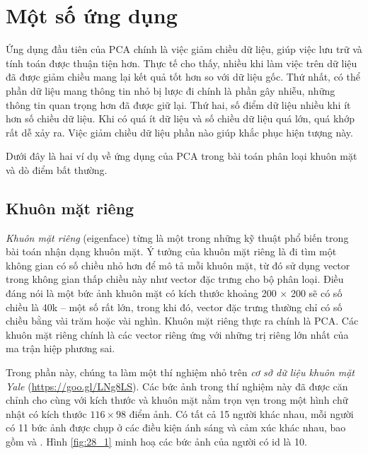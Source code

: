  
 
\section{Một số ứng dụng}
 Ứng dụng đầu tiên của PCA chính là việc giảm chiều dữ liệu, giúp
 việc lưu trữ và tính toán được thuận tiện hơn. Thực tế cho thấy, nhiều khi làm
 việc trên dữ liệu đã được giảm chiều mang lại kết quả tốt hơn so với dữ liệu
 gốc. Thứ nhất, có thể phần dữ liệu mang thông tin nhỏ bị lược đi chính là phần
 gây nhiễu, những thông tin quan trọng hơn đã được giữ lại. Thứ hai, số điểm dữ
 liệu nhiều khi ít hơn số chiều dữ liệu. Khi có quá ít dữ liệu và số chiều dữ
 liệu quá lớn, quá khớp rất dễ xảy ra. Việc giảm chiều dữ liệu phần nào giúp
 khắc phục hiện tượng này. 

 Dưới đây là hai ví dụ về ứng dụng của PCA trong bài toán phân loại khuôn mặt và dò điểm bất thường. 
 
\subsection{Khuôn mặt riêng}
\textit{Khuôn mặt riêng} (eigenface) từng là một trong những kỹ thuật phổ biến
trong bài toán nhận dạng khuôn mặt. Ý tưởng của khuôn mặt riêng là đi tìm một
không gian có số chiều nhỏ hơn để mô tả mỗi khuôn mặt, từ đó sử dụng vector
trong không gian thấp chiều này như vector đặc trưng cho bộ phân loại. Điều đáng
nói là một bức ảnh khuôn mặt có kích thước khoảng 200 $\times$ 200 sẽ có số
chiều là 40k -- một số rất lớn, trong khi đó, vector đặc trưng thường chỉ có số
chiều bằng vài trăm hoặc vài nghìn. Khuôn mặt riêng thực ra chính là PCA. Các
khuôn mặt riêng chính là các vector riêng ứng với những trị riêng lớn nhất của
ma trận hiệp phương sai.

Trong phần này, chúng ta làm một thí nghiệm nhỏ trên \textit{cơ sở dữ liệu
khuôn mặt Yale} (\url{https://goo.gl/LNg8LS}). Các bức ảnh trong thí nghiệm
này đã được căn chỉnh cho cùng với kích thước và khuôn mặt nằm trọn vẹn trong
một hình chữ nhật có kích thước $116 \times  98$ điểm ảnh. Có tất cả 15 người khác
nhau, mỗi người có 11 bức ảnh được chụp ở các điều kiện ánh sáng và cảm xúc khác
nhau, bao gồm  và
. Hình \ref{fig:28_1} minh hoạ các bức ảnh của
người có id là 10. 
 
